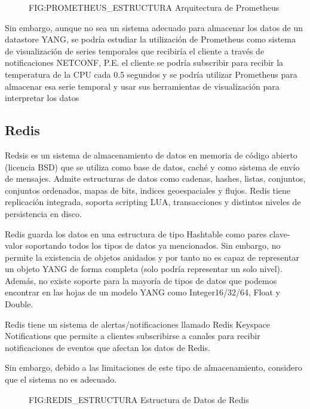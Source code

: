 \begin{figure}
    [Arquitectura de Prometheus]
    {FIG:PROMETHEUS_ESTRUCTURA}
    {Arquitectura de Prometheus}
\end{figure}

Sin embargo, aunque no sea un sistema adecuado para almacenar los datos de un datastore YANG, se podría estudiar la utilización de Prometheus como sistema de visualización de series temporales que recibiría el cliente a través de notificaciones NETCONF, P.E. el cliente se podría subscribir para recibir la temperatura de la CPU cada 0.5 segundos y se podría utilizar Prometheus para almacenar esa serie temporal y usar sus herramientas de visualización para interpretar los datos 


\subsection{Redis} 
Redsis \cite{redsis_main_page} es un sistema de almacenamiento de datos en memoria de código abierto (licencia BSD) que se utiliza como base de datos, caché y como sistema de envío de mensajes. Admite estructuras de datos como cadenas, hashes, listas, conjuntos, conjuntos ordenados, mapas de bits, indices geoespaciales y flujos. Redis tiene replicación integrada, soporta scripting LUA, transacciones y distintos niveles de persistencia en disco. 

Redis guarda los datos en una estructura de tipo Hashtable como pares clave-valor soportando todos los
tipos de datos ya mencionados. Sin embargo, no permite la existencia de objetos anidados y por tanto no es capaz de representar un objeto YANG de forma completa (solo podría representar un solo nivel).
Además, no existe soporte para la mayoría de tipos de datos que podemos encontrar en las hojas de un modelo YANG como Integer16/32/64, Float y Double.

Redis tiene un sistema de alertas/notificaciones llamado Redis Keyspace Notifications que permite
a clientes subscribirse a canales para recibir notificaciones de eventos que afectan los datos de Redis. 

Sin embargo, debido a las limitaciones de este tipo de almacenamiento, considero que el sistema no es adecuado.

\begin{figure}
    [Estructura de Datos de Redis]
    {FIG:REDIS_ESTRUCTURA}
    {Estructura de Datos de Redis}
\end{figure}


